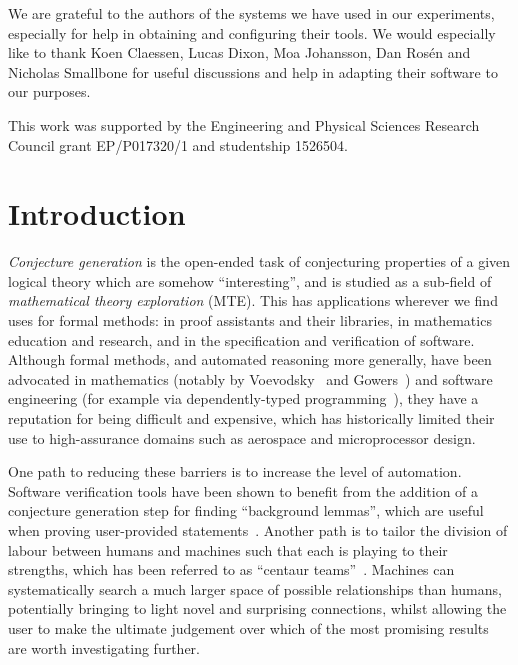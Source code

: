 \begin{acknowledgements}
  We are grateful to the authors of the systems we have used in our experiments,
  especially for help in obtaining and configuring their tools. We would
  especially like to thank Koen Claessen, Lucas Dixon, Moa Johansson, Dan
  Ros\'{e}n and Nicholas Smallbone for useful discussions and help in adapting
  their software to our purposes.

  This work was supported by the Engineering and Physical Sciences Research
  Council grant EP/P017320/1 and studentship 1526504.
\end{acknowledgements}

\pagebreak

\section{Introduction}
\label{intro}

\emph{Conjecture generation} is the open-ended task of conjecturing properties
of a given logical theory which are somehow ``interesting'', and is
studied as a sub-field of \emph{mathematical theory exploration} (MTE). This has
applications wherever we find uses for formal methods: in proof assistants and
their libraries, in mathematics education and research, and in the specification
and verification of software. Although formal methods, and automated reasoning
more generally, have been advocated in mathematics (notably by
Voevodsky~\cite{voevodsky2010univalent} and Gowers~\cite{ganesalingam2013fully})
and software engineering (for example via dependently-typed
programming~\cite{McKinna:2006}), they have a reputation for being difficult and
expensive, which has historically limited their use to high-assurance domains
such as aerospace and microprocessor design.

One path to reducing these barriers is to increase the level of automation.
Software verification tools have been shown to benefit from the addition of a
conjecture generation step for finding ``background lemmas'', which are useful
when proving user-provided statements~\cite{Claessen.Johansson.Rosen.ea:2013}.
Another path is to tailor the division of labour between humans and machines
such that each is playing to their strengths, which has been referred to as
``centaur teams''~\cite{harari2017reboot,davenport2015beyond}. Machines can
systematically search a much larger space of possible relationships than humans,
potentially bringing to light novel and surprising connections, whilst allowing
the user to make the ultimate judgement over which of the most promising results
are worth investigating further.

